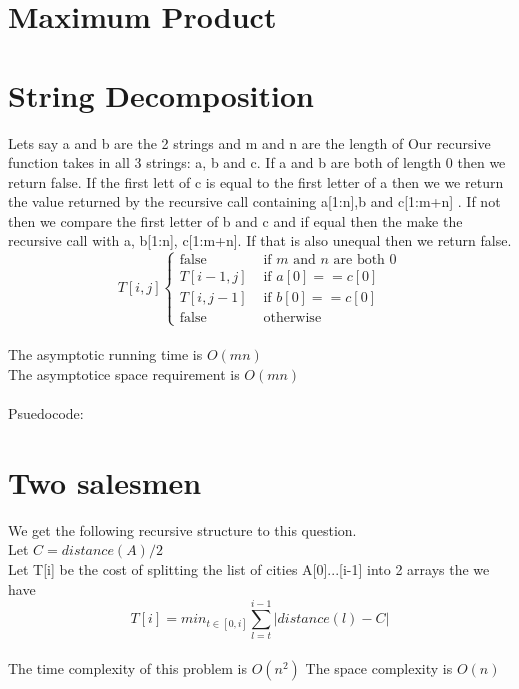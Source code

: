 \documentclass{article}
\begin{document}
\section{Maximum Product}
\label{sec:Maximum Product}

\section{String Decomposition}
\label{sec:String Decomposition}
    Lets say a and b are the 2 strings and m and n are the length of
    Our recursive function takes in all 3 strings: a, b and c. If a and b are both of length 0 then we return false. If the first lett of c is equal to the first letter of a then we we return the value returned by the recursive call containing a[1:n],b and c[1:m+n] .
    If not then we compare the first letter of b and c and if equal then the make the recursive call with a, b[1:n], c[1:m+n]. If that is also unequal then we return false.
    \\
    \[
    T[i,j]
    \begin{cases}
        \text{false} &\text{ if }m \text{ and } n \text{ are both 0}\\
        T[i-1, j]&\text{ if }a[0] == c[0]\\
        T[i, j-1]&\text{ if }b[0] == c[0]\\
        \text{false} &\text{ otherwise}
    \end{cases}
    \]\\
    The asymptotic running time is $O(mn)$\\
    The asymptotice space requirement is $O(mn)$\\\\Psuedocode:

    

\section{Two salesmen}
\label{sec:Two salesmen}
    We get the following recursive structure to this question.\\
    Let $ C = distance(A)/2$ \\
    Let T[i] be the cost of splitting the list of cities A[0]...[i-1] into 2 arrays the we have
    \[T[i] = min_{t\in[0,i]}\sum_{l=t}^{i-1}|distance(l) - C|\]\\
    The time complexity of this problem is $O(n^2)$
    The space complexity is $O(n)$
\end{document}
